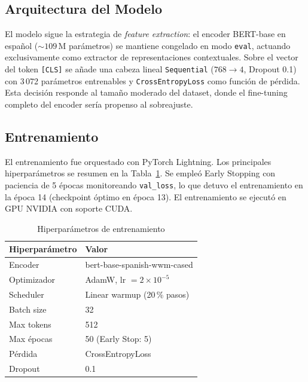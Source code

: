 \documentclass[conference]{IEEEtran}
\begin{document}
\subsection{Arquitectura del Modelo}

El modelo sigue la estrategia de \textit{feature extraction}: el encoder
BERT-base en español (${\sim}109$\,M parámetros) se mantiene congelado en
modo \texttt{eval}, actuando exclusivamente como extractor de representaciones
contextuales. Sobre el vector del token \texttt{[CLS]} se añade una
cabeza lineal \texttt{Sequential} ($768\!\to\!4$, Dropout 0.1) con
3\,072 parámetros entrenables y \texttt{CrossEntropyLoss} como función
de pérdida. Esta decisión responde al tamaño moderado del dataset, donde
el fine-tuning completo del encoder sería propenso al sobreajuste.

\subsection{Entrenamiento}

El entrenamiento fue orquestado con PyTorch Lightning. Los principales
hiperparámetros se resumen en la Tabla~\ref{tab:hyper}. Se empleó
Early Stopping con paciencia de 5 épocas monitoreando
\texttt{val\_loss}, lo que detuvo el entrenamiento en la época 14
(checkpoint óptimo en época 13). El entrenamiento se ejecutó en GPU NVIDIA
con soporte CUDA.

\begin{table}[h]
\centering
\caption{Hiperparámetros de entrenamiento}
\label{tab:hyper}
\begin{tabular}{ll}
\toprule
\textbf{Hiperparámetro} & \textbf{Valor} \\
\midrule
Encoder            & bert-base-spanish-wwm-cased \\
Optimizador        & AdamW, lr $= 2\times10^{-5}$ \\
Scheduler          & Linear warmup (20\,\% pasos) \\
Batch size         & 32 \\
Max tokens         & 512 \\
Max épocas         & 50 (Early Stop: 5) \\
Pérdida            & CrossEntropyLoss \\
Dropout            & 0.1 \\
\bottomrule
\end{tabular}
\end{table}

\end{document}
